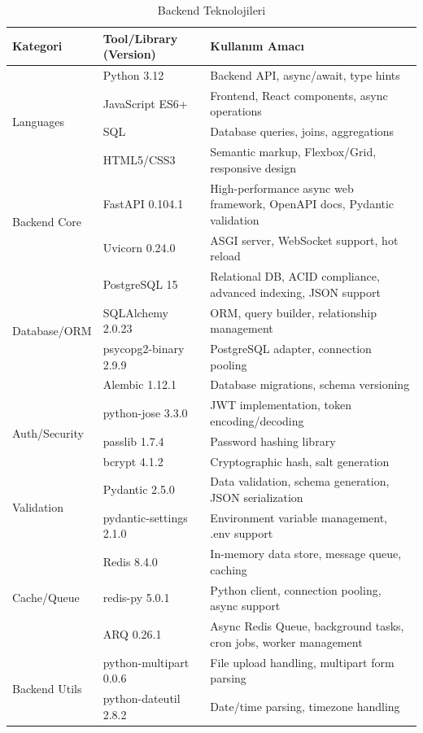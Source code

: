 \documentclass[a4paper,12pt]{report}
\begin{document}
\begin{table}[h]
\centering
\tiny
\begin{tabular}{|l|l|p{9cm}|}
\hline
\textbf{Kategori} & \textbf{Tool/Library (Version)} & \textbf{Kullanım Amacı} \\ \hline
\multirow{4}{*}{Languages}
& Python 3.12 & Backend API, async/await, type hints \\ \cline{2-3}
& JavaScript ES6+ & Frontend, React components, async operations \\ \cline{2-3}
& SQL & Database queries, joins, aggregations \\ \cline{2-3}
& HTML5/CSS3 & Semantic markup, Flexbox/Grid, responsive design \\ \hline
\multirow{2}{*}{Backend Core}
& FastAPI 0.104.1 & High-performance async web framework, OpenAPI docs, Pydantic validation \\ \cline{2-3}
& Uvicorn 0.24.0 & ASGI server, WebSocket support, hot reload \\ \hline
\multirow{4}{*}{Database/ORM}
& PostgreSQL 15 & Relational DB, ACID compliance, advanced indexing, JSON support \\ \cline{2-3}
& SQLAlchemy 2.0.23 & ORM, query builder, relationship management \\ \cline{2-3}
& psycopg2-binary 2.9.9 & PostgreSQL adapter, connection pooling \\ \cline{2-3}
& Alembic 1.12.1 & Database migrations, schema versioning \\ \hline
\multirow{3}{*}{Auth/Security}
& python-jose 3.3.0 & JWT implementation, token encoding/decoding \\ \cline{2-3}
& passlib 1.7.4 & Password hashing library \\ \cline{2-3}
& bcrypt 4.1.2 & Cryptographic hash, salt generation \\ \hline
\multirow{2}{*}{Validation}
& Pydantic 2.5.0 & Data validation, schema generation, JSON serialization \\ \cline{2-3}
& pydantic-settings 2.1.0 & Environment variable management, .env support \\ \hline
\multirow{3}{*}{Cache/Queue}
& Redis 8.4.0 & In-memory data store, message queue, caching \\ \cline{2-3}
& redis-py 5.0.1 & Python client, connection pooling, async support \\ \cline{2-3}
& ARQ 0.26.1 & Async Redis Queue, background tasks, cron jobs, worker management \\ \hline
\multirow{2}{*}{Backend Utils}
& python-multipart 0.0.6 & File upload handling, multipart form parsing \\ \cline{2-3}
& python-dateutil 2.8.2 & Date/time parsing, timezone handling \\ \hline
\end{tabular}
\caption{Backend Teknolojileri}
\end{table}
\end{document}
